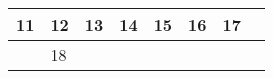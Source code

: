 {\begin{tabularx}{\linewidth}{|l!{\vrule width \myLenLineThicknessThick}*{7}{@{}X@{}|}}
      
      
        \begin{minipage}[t]{6mm}\centering{}11\end{minipage}
      
       & 
    
      
      
        \begin{minipage}[t]{6mm}\centering{}12\end{minipage}
      
       & 
    
      
      
        \begin{minipage}[t]{6mm}\centering{}13\end{minipage}
      
       & 
    
      
      
        \begin{minipage}[t]{6mm}\centering{}14\end{minipage}
      
       & 
    
      
      
        \begin{minipage}[t]{6mm}\centering{}15\end{minipage}
      
       & 
    
      
      
        \begin{minipage}[t]{6mm}\centering{}16\end{minipage}
      
       & 
    
      
      
        \begin{minipage}[t]{6mm}\centering{}17\end{minipage}
      
      
        \\  \hline 
      
    
  
  
  
  \hyperlink{week-2025-33}{} &
    
      
      
        \begin{minipage}[t]{6mm}\centering{}18\end{minipage}
      

\end{tabularx}}
